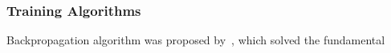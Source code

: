 \subsubsection{Training Algorithms}
Backpropagation algorithm was proposed by~\citet{werbos1975beyond}, which solved the fundamental 